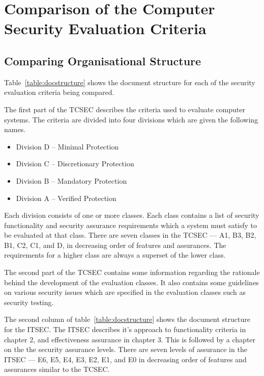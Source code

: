 \chapter{Comparison of the Computer Security Evaluation Criteria} 

\section{Comparing Organisational Structure} 
\label{structure}

    Table~\ref{table:docstructure} shows the document structure for each of the
    security evaluation criteria being compared. 

    The first part of the TCSEC describes the 
    criteria used to evaluate computer systems. The criteria are divided into
    four divisions which are given the following names.
        \begin{itemize}
            \item Division D -- Minimal Protection
            \item Division C -- Discretionary Protection
            \item Division B -- Mandatory Protection
            \item Division A -- Verified Protection
        \end{itemize}
    Each division consists of one or more classes. 
    Each class contains a list of security functionality and security assurance
    requirements which a system must satisfy to be evaluated at that class.
    There are seven classes in the TCSEC --- A1, B3, B2, B1, C2, C1, and D, in 
    decreasing order of features and assurances.
    The requirements for a higher class are always a superset of the lower class.

    The second part of the TCSEC contains some information regarding the rationale
    behind the development of the evaluation classes. It also contains some
    guidelines on various security issues which are specified in the evaluation classes 
    such as security testing.

    The second column of table~\ref{table:docstructure} shows the document structure
    for the ITSEC. The ITSEC describes it's approach to functionality
    criteria in chapter 2, and effectiveness assurance in chapter 3.
    This is followed by a chapter on the the security assurance levels.
    There are seven levels of assurance in the ITSEC --- E6, E5, E4, E3, E2,
    E1, and E0 in decreasing order of features and assurances similar to the
    TCSEC. 


